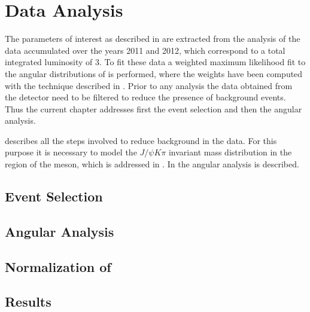 \chapter{Data Analysis}
\label{Data_Analysis}

The parameters of interest as described in  are extracted from the analysis of the
\runone \lhcb data accumulated over the years 2011 and 2012, which correspond to a total integrated luminosity
of 3\invfb. To fit these data a weighted maximum likelihood fit to the angular distributions of \BsJpsiKst is performed,
where the weights have been computed with the \sPlot technique \cite{splot} described in .
Prior to any analysis the data obtained from the detector need to be filtered to reduce the presence of 
background events. Thus the current chapter addresses first the event selection and then the angular analysis.

 describes all the steps involved to reduce background in the data. For this purpose
it is necessary to model the $J/\psi K\pi$ invariant mass distribution in the region of the \Bs meson, which
is addressed in . In  the angular analysis is described.\\

\section{Event Selection}
\label{Event_Selection}


\section{Angular Analysis}
\label{Angular_Analysis}


\section{Normalization of \BsJpsiKpi}
\label{Normalization}


\section{Results}
\label{Results}


